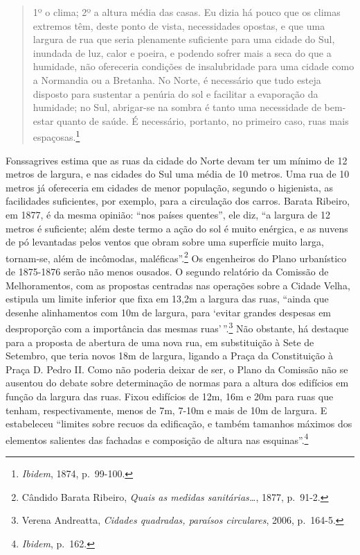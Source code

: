 \begin{quote}
1º o clima; 2º a altura média das casas. Eu dizia há pouco que os climas
extremos têm, deste ponto de vista, necessidades opostas, e que uma
largura de rua que seria plenamente suficiente para uma cidade do Sul,
inundada de luz, calor e poeira, e podendo sofrer mais a seca do que a
humidade, não ofereceria condições de insalubridade para uma cidade como
a Normandia ou a Bretanha. No Norte, é necessário que tudo esteja
disposto para sustentar a penúria do sol e facilitar a evaporação da
humidade; no Sul, abrigar-se na sombra é tanto uma necessidade de
bem-estar quanto de saúde. É necessário, portanto, no primeiro caso,
ruas mais espaçosas.\footnote{\emph{Ibidem}, 1874, p.~99-100.}
\end{quote}

Fonssagrives estima que as ruas da cidade do Norte devam ter um mínimo
de 12 metros de largura, e nas cidades do Sul uma média de 10 metros.
Uma rua de 10 metros já ofereceria em cidades de menor população,
segundo o higienista, as facilidades suficientes, por exemplo, para a
circulação dos carros. Barata Ribeiro, em 1877, é da mesma opinião:
``nos países quentes'', ele diz, ``a largura de 12 metros é suficiente;
além deste termo a ação do sol é muito enérgica, e as nuvens de pó
levantadas pelos ventos que obram sobre uma superfície muito larga,
tornam-se, além de incômodas, maléficas''.\footnote{Cândido Barata
  Ribeiro, \emph{Quais as medidas sanitárias\ldots{}}, 1877, p.~91-2.}
Os engenheiros do Plano urbanístico de 1875-1876 serão não menos
ousados. O segundo relatório da Comissão de Melhoramentos, com as
propostas centradas nas operações sobre a Cidade Velha, estipula um
limite inferior que fixa em 13,2m a largura das ruas, ``ainda que
desenhe alinhamentos com 10m de largura, para `evitar grandes despesas
em desproporção com a importância das mesmas ruas'\,''.\footnote{Verena
  Andreatta, \emph{Cidades quadradas, paraísos circulares}, 2006,
  p.~164-5.} Não obstante, há destaque para a proposta de abertura de
uma nova rua, em substituição à Sete de Setembro, que teria novos 18m de
largura, ligando a Praça da Constituição à Praça D. Pedro II. Como não
poderia deixar de ser, o Plano da Comissão não se ausentou do debate
sobre determinação de normas para a altura dos edifícios em função da
largura das ruas. Fixou edifícios de 12m, 16m e 20m para ruas que
tenham, respectivamente, menos de 7m, 7-10m e mais de 10m de largura. E
estabeleceu ``limites sobre recuos da edificação, e também tamanhos
máximos dos elementos salientes das fachadas e composição de altura nas
esquinas''.\footnote{\emph{Ibidem}, p.~162.}

